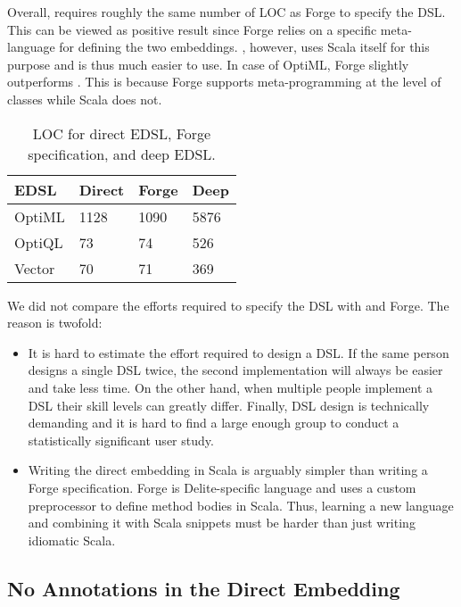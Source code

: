 Overall, \tool requires roughly the same number of LOC as Forge to specify the DSL.
This can be viewed as positive result since Forge relies on a specific meta-language
 for defining the two embeddings. \tool, however, uses Scala itself
for this purpose and is thus much easier to use. In case of OptiML, Forge
slightly outperforms \tool. This is because Forge supports meta-programming at
the level of classes while Scala does not.

\begin{table}[h]
\caption{LOC for direct EDSL, Forge specification, and deep EDSL.}
\label{tbl:deepgen}
\centering
\begin{tabularx}{\linewidth}{ X X X X }
\toprule
 EDSL       &   Direct      &     Forge     &   Deep      \\ \midrule
OptiML      &   1128        &     1090    &   5876      \\
OptiQL      &   73          &     74      &   526       \\
Vector      &   70          &     71      &   369       \\
\bottomrule
\end{tabularx}
\end{table}

We did not compare the efforts required to specify the DSL with \tool and Forge. The
reason is twofold:
\begin{itemize}

\item It is hard to estimate the effort required to design a DSL. If the same
person designs a single DSL twice, the second implementation will always be
easier and take less time. On the other hand, when multiple people implement a DSL their skill levels
can greatly differ. Finally, DSL design is technically demanding and it is hard to find
a large enough group to conduct a statistically significant user
study.

\item Writing the direct embedding in Scala is arguably simpler than writing a
Forge specification. Forge is Delite-specific language and uses a custom
preprocessor to define method bodies in Scala. Thus, learning a new language and
combining it with Scala snippets must be harder than just writing idiomatic
Scala.
\end{itemize}

\subsection{No Annotations in the Direct Embedding}
\label{subsec:correctness}

